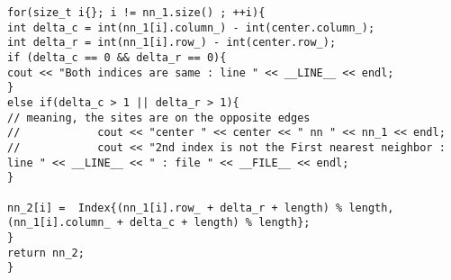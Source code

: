 \begin{lstlisting}[style=CStyle]
for(size_t i{}; i != nn_1.size() ; ++i){
int delta_c = int(nn_1[i].column_) - int(center.column_);
int delta_r = int(nn_1[i].row_) - int(center.row_);
if (delta_c == 0 && delta_r == 0){
cout << "Both indices are same : line " << __LINE__ << endl;
}
else if(delta_c > 1 || delta_r > 1){
// meaning, the sites are on the opposite edges
//            cout << "center " << center << " nn " << nn_1 << endl;
//            cout << "2nd index is not the First nearest neighbor : line " << __LINE__ << " : file " << __FILE__ << endl;
}

nn_2[i] =  Index{(nn_1[i].row_ + delta_r + length) % length, (nn_1[i].column_ + delta_c + length) % length};
}
return nn_2;
}
\end{lstlisting}

